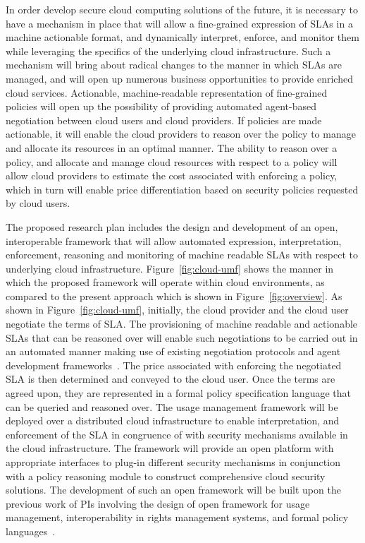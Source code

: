 \documentclass[10pt, conference, compsocconf]{IEEEtran}
\begin{document}
In order develop secure cloud computing solutions of the future, it is necessary to have a mechanism in place that will allow a fine-grained expression of SLAs in a machine actionable format, and dynamically interpret, enforce, and monitor them while leveraging the specifics of the underlying cloud infrastructure. Such a mechanism will bring about radical changes to the manner in which SLAs are managed, and will open up numerous business opportunities to provide enriched cloud services. Actionable, machine-readable representation of fine-grained policies will open up the possibility of providing automated agent-based negotiation between cloud users and cloud providers. If policies are made actionable, it will enable the cloud providers to reason over the policy to manage and allocate its resources in an optimal manner. The ability to reason over a policy, and allocate and manage cloud resources with respect to a policy will allow cloud providers to estimate the cost associated with enforcing a policy, which in turn will enable price differentiation based on security policies requested by cloud users.
 
The proposed research plan includes the design and development of an open, interoperable framework that will allow automated expression, interpretation, enforcement, reasoning and monitoring of machine readable SLAs with respect to underlying cloud infrastructure. Figure~\ref{fig:cloud-umf} shows the manner in which the proposed framework will operate within cloud environments, as compared to the present approach which is shown in Figure~\ref{fig:overview}. As shown in Figure~\ref{fig:cloud-umf}, initially, the cloud provider and the cloud user negotiate the terms of SLA. The provisioning of machine readable and actionable SLAs that can be reasoned over will enable such negotiations to be carried out in an automated manner making use of existing negotiation protocols and agent development frameworks~\cite{BePoRi:02,FIPA}. The price associated with enforcing the negotiated SLA is then determined and conveyed to the cloud user. Once the terms are agreed upon, they are represented in a formal policy specification language that can be queried and reasoned over. The usage management framework will be deployed over a distributed cloud infrastructure to enable interpretation, and enforcement of the SLA in congruence of with security mechanisms available in the cloud infrastructure. The framework will provide an open platform with appropriate interfaces to plug-in different security mechanisms in conjunction with a policy reasoning module to construct comprehensive cloud security solutions. The development of such an open framework will be built upon the previous work of PIs involving the design of open framework for usage management, interoperability in rights management systems, and formal policy languages~\cite{JaHe:09,JaHeLa:10}.
\end{document}
